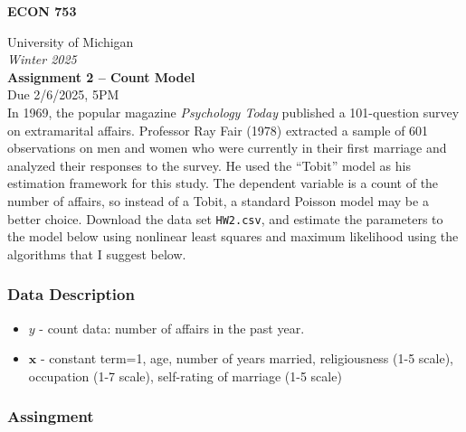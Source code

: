 \documentclass[11pt]{article}
\newcommand{\bs}{\boldsymbol}
\begin{document}
\noindent
\textbf{ECON 753}

\noindent
University of Michigan\\
\emph{Winter 2025}\\[1em]

\noindent
\textbf{Assignment 2 -- Count Model}\\
Due 2/6/2025, 5PM\\[3em]


In 1969, the popular magazine \emph{Psychology Today} published a 101-question survey on extramarital affairs. Professor Ray Fair (1978) extracted a sample of 601 observations on men and women who were currently in their first marriage and analyzed their responses to the survey. He used the ``Tobit'' model as his estimation framework for this study. The dependent variable is a count of the number of affairs, so instead of a Tobit, a standard Poisson model may be a better choice. Download the data set \texttt{HW2.csv}, and estimate the parameters to the model below using nonlinear least squares and maximum likelihood using the algorithms that I suggest below. 

\subsubsection*{Data Description} %
 \label{ssub:data_description}

 \begin{itemize}
 	\item $y$ - count data: number of affairs in the past year.
 	\item $\bs{x}$ - constant term=1, age, number of years married, religiousness (1-5 scale), occupation (1-7 scale), self-rating of marriage (1-5 scale)
 \end{itemize}

\subsubsection*{Assingment} %
\label{ssub:assingment}
\end{document}
